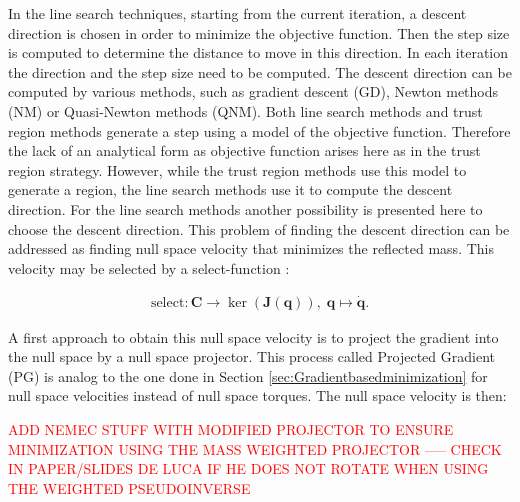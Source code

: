 In the line search techniques, starting from the current iteration, a descent direction is chosen in order to minimize the objective function. Then the step size is computed to determine the distance to move in this direction. In each iteration the direction and the step size need to be computed. The descent direction can be computed by various methods, such as gradient descent (GD), Newton methods (NM) or Quasi-Newton methods (QNM). %
Both line search methods and trust region methods generate a step using a model of the objective function. Therefore the lack of an analytical form as objective function arises here as in the trust region strategy.
However, while the trust region methods use this model to generate a region, the line search methods use it to compute the descent direction.  For the line search methods another possibility is presented here to choose the descent direction. 
This problem of finding the descent direction can be addressed as finding null space velocity that minimizes the reflected mass. This velocity may be selected by a  select-function :

\begin{align}
\text{select}: \mathbf{C}\rightarrow\ker(\mathbf{J}(\mathbf{q})),\; \mathbf{q}\mapsto\dot{\mathbf{q}} .
\end{align}

%
%

A first approach to obtain this null space velocity is to project the gradient into the null space by a null space projector. This process called Projected Gradient (PG) \cite{PG_RG} is analog to the one done in Section \ref{sec:Gradientbasedminimization} for null space velocities instead of null space torques. The null space velocity is then:

\textcolor{red}{ADD NEMEC STUFF WITH MODIFIED PROJECTOR TO ENSURE MINIMIZATION USING THE MASS WEIGHTED PROJECTOR ----- CHECK IN PAPER/SLIDES DE LUCA IF HE DOES NOT ROTATE WHEN USING THE WEIGHTED PSEUDOINVERSE}

